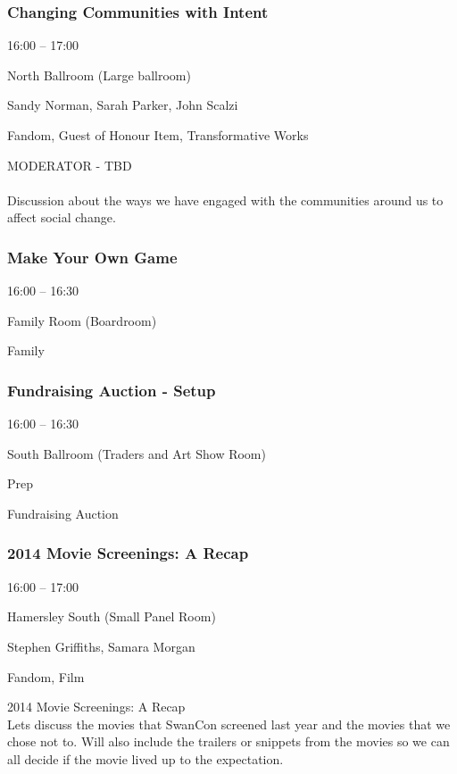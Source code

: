 \documentclass{scrreprt}
\begin{document}
\begin{multicols}{2}
\subsubsection*{Changing Communities with Intent}\begin{description}
\setlength{\itemsep}{0pt}
\setlength{\parsep}{0pt}
\setlength{\parskip}{0pt}
\item[Time:]{16:00 -- 17:00}
\item[Venue:]{North Ballroom (Large ballroom)}
\item[People:]{Sandy Norman, Sarah Parker, John Scalzi}
\item[Tags:]{Fandom, Guest of Honour Item, Transformative Works}\end{description}
MODERATOR - TBD \\\\Discussion about the ways we have engaged with the communities around us to affect social change.
\subsubsection*{Make Your Own Game}\begin{description}
\setlength{\itemsep}{0pt}
\setlength{\parsep}{0pt}
\setlength{\parskip}{0pt}
\item[Time:]{16:00 -- 16:30}
\item[Venue:]{Family Room (Boardroom)}
\item[Tags:]{Family}\end{description}

\subsubsection*{Fundraising Auction - Setup}\begin{description}
\setlength{\itemsep}{0pt}
\setlength{\parsep}{0pt}
\setlength{\parskip}{0pt}
\item[Time:]{16:00 -- 16:30}
\item[Venue:]{South Ballroom (Traders and Art Show Room)}
\item[Tags:]{Prep}\end{description}
Fundraising Auction
\subsubsection*{2014 Movie Screenings: A Recap}\begin{description}
\setlength{\itemsep}{0pt}
\setlength{\parsep}{0pt}
\setlength{\parskip}{0pt}
\item[Time:]{16:00 -- 17:00}
\item[Venue:]{Hamersley South (Small Panel Room)}
\item[People:]{Stephen Griffiths, Samara Morgan}
\item[Tags:]{Fandom, Film}\end{description}
2014 Movie Screenings: A Recap\\Lets discuss the movies that SwanCon screened last year and the movies that we chose not to. Will also include the trailers or snippets from the movies so we can all decide if the movie lived up to the expectation.

\end{multicols}
\end{document}
